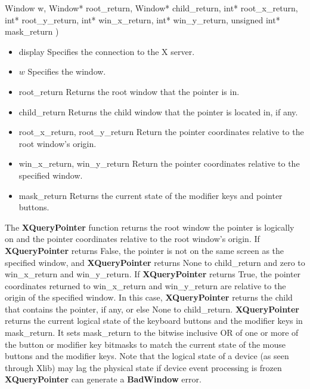 \documentclass{report}
\begin{document}
\begin{itemize}
\begin{cppcode}
                    Window w,
                    Window* root_return, Window* child_return,
                    int* root_x_return, int* root_y_return,
                    int* win_x_return, int* win_y_return,
                    unsigned int* mask_return
                )
            \end{cppcode}
            \bigbreak \noindent
            \begin{itemize}
                \item display Specifies the connection to the X server.
                \item $w$ Specifies the window.
                \item root\_return Returns the root window that the pointer is in.
                \item child\_return Returns the child window that the pointer is located in, if any.
                \item root\_x\_return, root\_y\_return Return the pointer coordinates relative to the root window’s origin.
                \item win\_x\_return, win\_y\_return Return the pointer coordinates relative to the specified window.
                \item mask\_return Returns the current state of the modifier keys and pointer buttons.
        \end{itemize}
        The \textbf{XQueryPointer} function returns the root window the pointer is logically on and the pointer coordinates relative to the root window’s origin. If \textbf{XQueryPointer} returns False, the pointer is not on the same screen as the specified window, and \textbf{XQueryPointer} returns None to child\_return and zero to win\_x\_return and win\_y\_return. If \textbf{XQueryPointer} returns True, the pointer coordinates returned to win\_x\_return and win\_y\_return are relative to the origin of the specified window. In this case, \textbf{XQueryPointer} returns the child that contains the pointer, if any, or else None to child\_return.
        \bigbreak \noindent 
        \textbf{XQueryPointer} returns the current logical state of the keyboard buttons and the modifier keys in mask\_return. It sets mask\_return to the bitwise inclusive OR of one or more of the button or modifier key bitmasks to match the current state of the mouse buttons and the modifier keys. Note that the logical state of a device (as seen through Xlib) may lag the physical state if device event processing is frozen
        \bigbreak \noindent 
        \textbf{XQueryPointer} can generate a \textbf{BadWindow} error.

\end{itemize}
\end{document}
